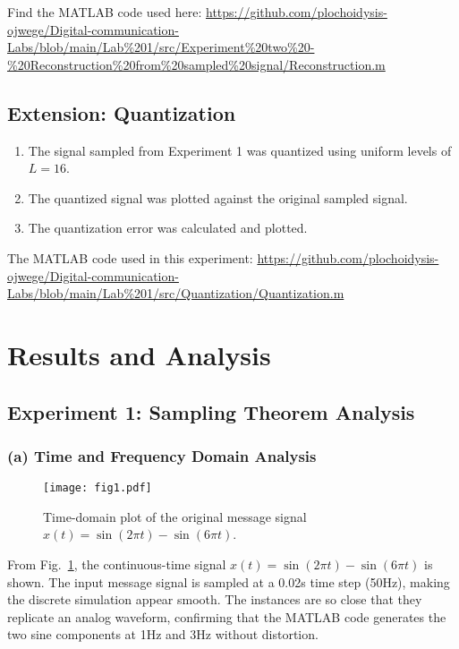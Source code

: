 \documentclass[conference]{IEEEtran}
\begin{document}
Find the MATLAB code used here:
\url{https://github.com/plochoidysis-ojwege/Digital-communication-Labs/blob/main/Lab%201/src/Experiment%20two%20-%20Reconstruction%20from%20sampled%20signal/Reconstruction.m}


\subsection{Extension: Quantization}
\begin{enumerate}
    \item The signal sampled from Experiment 1 was quantized using uniform levels of $L=16$.
    \item The quantized signal was plotted against the original sampled signal.
    \item The quantization error was calculated and plotted.
\end{enumerate}

The MATLAB code used in this experiment:  
\url{https://github.com/plochoidysis-ojwege/Digital-communication-Labs/blob/main/Lab%201/src/Quantization/Quantization.m}



\section{Results and Analysis}

\subsection{Experiment 1: Sampling Theorem Analysis}

\subsubsection{(a) Time and Frequency Domain Analysis}

\begin{figure}[H]
    \centering
    \texttt{[image: fig1.pdf]}
    \caption{Time-domain plot of the original message signal $x(t) = \sin(2\pi t) - \sin(6\pi t)$.}
    \label{fig:original_signal}
\end{figure}

From Fig.~\ref{fig:original_signal}, the continuous-time signal $x(t) = \sin(2\pi t) - \sin(6\pi t)$ is shown. The input message signal is sampled at a 0.02s time step (50Hz), making the discrete simulation appear smooth. The instances are so close that they replicate an analog waveform, confirming that the MATLAB code generates the two sine components at 1Hz and 3Hz without distortion.
\end{document}
